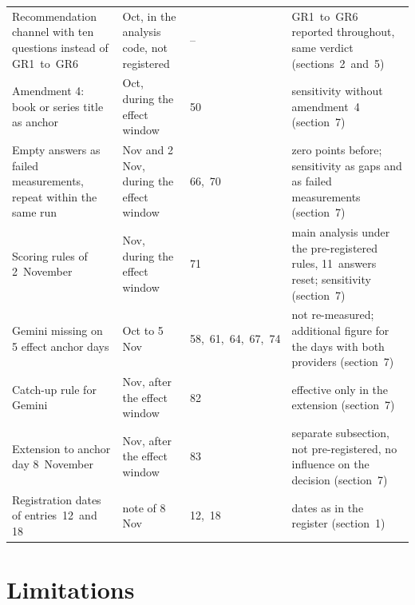 \documentclass[11pt]{article}
\begin{document}
\begin{table}[htbp]
\begin{tabularx}{\linewidth}{>{\raggedright\arraybackslash\hsize=1.0\hsize}X>{\raggedright\arraybackslash\hsize=0.7\hsize}Xl>{\raggedright\arraybackslash\hsize=1.3\hsize}X}
Recommendation channel with ten questions instead of GR1~to~GR6 & 7 Oct, in the analysis code, not registered & \mbox{–} & GR1~to~GR6 reported throughout, same verdict \mbox{(sections~2~and 5)} \\
Amendment 4: book or series title as anchor & 15 Oct, during the effect window & \mbox{50} & sensitivity without amendment~4 \mbox{(section~7)} \\
Empty answers as failed measurements, repeat within the same run & 1 Nov and 2 Nov, during the effect window & \mbox{66, 70} & zero points before; sensitivity as gaps and as failed measurements \mbox{(section~7)} \\
Scoring rules of 2~November & 2 Nov, during the effect window & \mbox{71} & main analysis under the pre-registered rules, 11~answers reset; sensitivity \mbox{(section~7)} \\
Gemini missing on 5 effect anchor days & 24 Oct to 5 Nov & \mbox{58, 61, 64, 67, 74} & not re-measured; additional figure for the days with both providers \mbox{(section~7)} \\
Catch-up rule for Gemini & 8 Nov, after the effect window & \mbox{82} & effective only in the extension \mbox{(section~7)} \\
Extension to anchor day 8~November & 8 Nov, after the effect window & \mbox{83} & separate subsection, not pre-registered, no influence on the decision \mbox{(section~7)} \\
Registration dates of entries~12~and 18 & note of 8 Nov & \mbox{12, 18} & dates as in the register \mbox{(section~1)} \\
\bottomrule\end{tabularx}\end{table}

\let\FBsave\FloatBarrier\let\FloatBarrier\relax{}\section{Limitations}\let\FloatBarrier\FBsave{}
\end{document}
